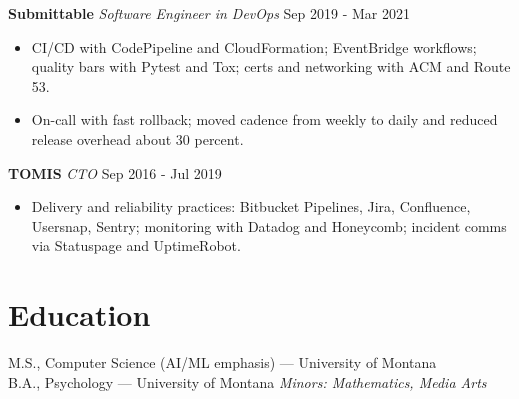 \documentclass[10pt]{article}
\begin{document}
\noindent\textbf{Submittable} \textit{Software Engineer in DevOps} \hfill Sep 2019 - Mar 2021\par
\begin{itemize}
  \item CI/CD with CodePipeline and CloudFormation; EventBridge workflows; quality bars with Pytest and Tox; certs and networking with ACM and Route 53.
  \item On-call with fast rollback; moved cadence from weekly to daily and reduced release overhead about 30 percent.
\end{itemize}

\noindent\textbf{TOMIS} \textit{CTO} \hfill Sep 2016 - Jul 2019\par
\begin{itemize}
  \item Delivery and reliability practices: Bitbucket Pipelines, Jira, Confluence, Usersnap, Sentry; monitoring with Datadog and Honeycomb; incident comms via Statuspage and UptimeRobot.
\end{itemize}

\section*{Education}
M.S., Computer Science (AI/ML emphasis) — University of Montana \\
B.A., Psychology — University of Montana \quad \emph{Minors: Mathematics, Media Arts}
\end{document}
